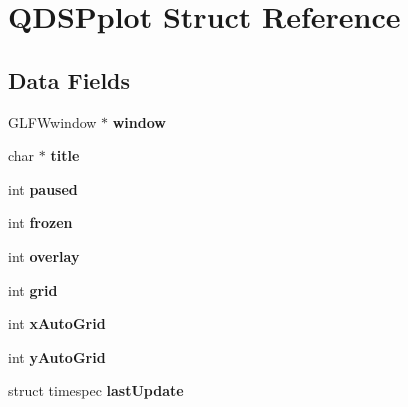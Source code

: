 \hypertarget{structQDSPplot}{\section{Q\-D\-S\-Pplot Struct Reference}
\label{structQDSPplot}
}
\subsection*{Data Fields}
\begin{DoxyCompactItemize}
\item 
\hypertarget{structQDSPplot_ad6042a08371f5fb7cbce791ae760fadc}{G\-L\-F\-Wwindow $\ast$ {\bfseries window}}\label{structQDSPplot_ad6042a08371f5fb7cbce791ae760fadc}

\item 
\hypertarget{structQDSPplot_affe120ee06f53d8639e78d67d97c9a27}{char $\ast$ {\bfseries title}}\label{structQDSPplot_affe120ee06f53d8639e78d67d97c9a27}

\item 
\hypertarget{structQDSPplot_a9224fcadda0deeb6a9515744a73c524b}{int {\bfseries paused}}\label{structQDSPplot_a9224fcadda0deeb6a9515744a73c524b}

\item 
\hypertarget{structQDSPplot_a7400bfdb8703137f659a7e9c4e995e5f}{int {\bfseries frozen}}\label{structQDSPplot_a7400bfdb8703137f659a7e9c4e995e5f}

\item 
\hypertarget{structQDSPplot_aaae7ce61f819424d2ecfa3cb2e1a3144}{int {\bfseries overlay}}\label{structQDSPplot_aaae7ce61f819424d2ecfa3cb2e1a3144}

\item 
\hypertarget{structQDSPplot_aa62adc0e3687db7d92c279f327ca0dd4}{int {\bfseries grid}}\label{structQDSPplot_aa62adc0e3687db7d92c279f327ca0dd4}

\item 
\hypertarget{structQDSPplot_a24193140f11eb031dac504041ea8b1f1}{int {\bfseries x\-Auto\-Grid}}\label{structQDSPplot_a24193140f11eb031dac504041ea8b1f1}

\item 
\hypertarget{structQDSPplot_a2bead137a1474281f9c2c4f3e08d21a7}{int {\bfseries y\-Auto\-Grid}}\label{structQDSPplot_a2bead137a1474281f9c2c4f3e08d21a7}

\item 
\hypertarget{structQDSPplot_a11101c3a7b12c3646955ad88ec106f82}{struct timespec {\bfseries last\-Update}}\label{structQDSPplot_a11101c3a7b12c3646955ad88ec106f82}


\end{DoxyCompactItemize}
